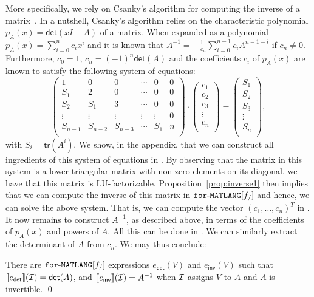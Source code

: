 More specifically, we rely on Csanky's algorithm for computing the inverse of a matrix~\cite{Csanky76}. In a nutshell, Csanky's algorithm relies on the characteristic
polynomial $p_A(x)=\mathsf{det}(xI-A)$ of a matrix. When expanded as a polynomial
$p_A(x)=\sum_{i=0}^{n} c_i x^i$ and it is known that $A^{-1}=\frac{-1}{\phantom{-1}c_n}\sum_{i=0}^{n-1}c_i A^{n-1-i}$
if $c_n\neq 0$. Furthermore, $c_0=1$, $c_n=(-1)^n\mathsf{det}(A)$ and the coefficients $c_i$ of $p_A(x)$
are known to satisfy the following system of equations:
$$
\left(\begin{matrix}
1 & 0 & 0 & \cdots & 0 & 0\\
S_1 & 2 & 0 & \cdots  &0 & 0\\
S_2 & S_1 & 3 & \cdots  &0 & 0\\
\vdots & \vdots & \vdots & \vdots & \vdots & 0\\
S_{n-1} & S_{n-2} & S_{n-3} & \cdots & S_1 & n\\
\end{matrix}\right)\cdot
\left(\begin{matrix}
c_1\\
c_2\\
c_3\\
\vdots\\
c_n\\
\end{matrix}\right)=\left(\begin{matrix}
S_1\\
S_2\\
S_3\\
\vdots\\
S_n\\
\end{matrix}\right),
$$
with $S_i=\mathsf{tr}(A^i)$. We show, in the appendix, that we can construct all ingredients of this system of equations in \langfor. By observing that the matrix in this system is a lower triangular matrix with non-zero elements on its diagonal, we have that this matrix is LU-factorizable. Proposition~\ref{prop:inverse1} then implies that we can compute the inverse of this matrix in 
$\texttt{for}\text{-}\texttt{MATLANG}[f_/]$ and hence, we can solve the above system. That is, we can compute the vector $(c_1,\ldots,c_n)^T$ in \langfor. It now remains to construct $A^{-1}$,
as described above, in terms of the coefficients of $p_A(x)$ and powers of $A$. All this can be done
in \langfor. We can similarly extract the determinant of $A$ from $c_n$. We may thus conclude:
\begin{proposition}\label{prop:inverse}
There are $\texttt{for}\text{-}\texttt{MATLANG}[f_/]$ expressions $e_{\mathsf{det}}(V)$ and $e_{\mathsf{inv}}(V)$ such that
$\llbracket e_{\mathsf{det}} \rrbracket(\mathcal{I})=\mathsf{det}(A)$, and  
$\llbracket e_{\mathsf{inv}} \rrbracket(\mathcal{I})=A^{-1}$ when $\mathcal{I}$ assigns $V$
to $A$ and $A$ is invertible.
\qed
\end{proposition}

